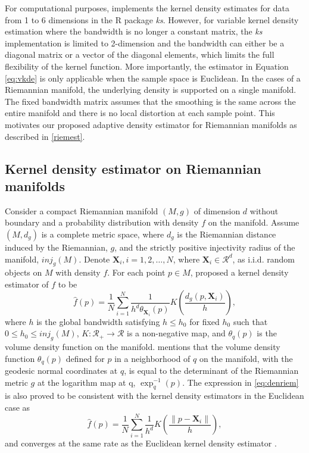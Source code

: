 \documentclass[11pt,a4paper,]{article}
\begin{document}
For computational purposes, \textcite{Duong2007-up} implements the kernel density estimates for data from 1 to 6 dimensions in the R package \emph{ks}.
However, for variable kernel density estimation where the bandwidth is no longer a constant matrix, the \emph{ks} implementation is limited to 2-dimension and the bandwidth can either be a diagonal matrix or a vector of the diagonal elements, which limits the full flexibility of the kernel function.
More importantly, the estimator in Equation \eqref{eq:vkde} is only applicable when the sample space is Euclidean. In the cases of a Riemannian manifold, the underlying density is supported on a single manifold. The fixed bandwidth matrix assumes that the smoothing is the same across the entire manifold and there is no local distortion at each sample point. This motivates our proposed adaptive density estimator for Riemannian manifolds as described in \autoref{riemest}.

\hypertarget{riemest}{%
\subsection{Kernel density estimator on Riemannian manifolds}\label{riemest}}

Consider a compact Riemannian manifold \((M, g)\) of dimension \(d\) without boundary and a probability distribution with density \(f\) on the manifold. Assume \((M, d_g)\) is a complete metric space, where \(d_g\) is the Riemannian distance induced by the Riemannian, \(g\), and the strictly positive injectivity radius \autocite{Chavel2006-mp} of the manifold, \(inj_g(M)\). Denote \(\pmb{X}_i, i = 1, 2, \dots, N\), where \(\pmb{X}_i \in \mathcal{R}^d\), as i.i.d. random objects on \(M\) with density \(f\). For each point \(p\in M\), \textcite{Pelletier2005-vu} proposed a kernel density estimator of \(f\) to be
\begin{equation}
\label{eq:denriem}
\hat{f}(p) = \frac{1}{N} \sum_{i=1}^{N} \frac{1}{h^d \theta_{\pmb{X}_i}(p)} K(\frac{d_g(p, \pmb{X}_i)}{h}),
\end{equation}
where \(h\) is the global bandwidth satisfying \(h \leq h_0\) for fixed \(h_0\) such that \(0\leq h_0\leq inj_g(M)\), \(K: \mathcal{R}_{+} \rightarrow \mathcal{R}\) is a non-negative map, and \(\theta_{q}(p)\) is the volume density function on the manifold.
\textcite{Pelletier2005-vu} mentions that the volume density function \(\theta_q(p)\) defined for \(p\) in a neighborhood of \(q\) on the manifold, with the geodesic normal coordinates at \(q\), is equal to the determinant of the Riemannian metric \(g\) at the logarithm map at q, \(\exp_q^{-1}(p)\). The expression in \eqref{eq:denriem} is also proved to be consistent with the kernel density estimators in the Euclidean case as
\begin{equation}
\label{eq:denconsist}
\hat{f}(p) = \frac{1}{N} \sum_{i=1}^{N} \frac{1}{h^d} K(\frac{\|p-\pmb{X}_i\|}{h}),
\end{equation}
and converges at the same rate as the Euclidean kernel density estimator \autocite{Henry2009-ll}.
\end{document}
